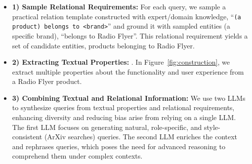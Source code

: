 \begin{itemize}[leftmargin=*]
\vspace{-2pt}
\item \textbf{1) Sample Relational Requirements:} For each query, we sample a practical relation template constructed with expert/domain knowledge, \eg ``\texttt{(a product) belongs to <brand>}'' and ground it with sampled entities (\ie a specific brand), \eg ``belongs to Radio Flyer''. 
This relational requirement yields a set of candidate entities, \ie products belonging to Radio Flyer. 
\vspace{-2pt}
\item \textbf{2) Extracting Textual Properties:} .  In Figure~\ref{fig:construction}, we extract multiple properties about the functionality and user experience from a Radio Flyer product. 
\vspace{-2pt}
\item \textbf{3) Combining Textual and Relational Information:} 
We use two LLMs to synthesize queries from textual properties and relational requirements, enhancing diversity and reducing bias arise from relying on a single LLM. 
The first LLM focuses on generating natural, role-specific, and style-consistent (\eg ArXiv searches) queries. The second LLM enriches the context and rephrases queries, which poses the need for advanced reasoning to comprehend them under complex contexts.


\end{itemize}
